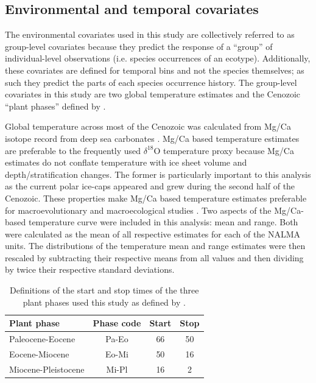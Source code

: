 \documentclass[12pt,letterpaper]{article}
\begin{document}
\subsection*{Environmental and temporal covariates}
The environmental covariates used in this study are collectively referred to as group-level covariates because they predict the response of a ``group'' of individual-level observations (i.e. species occurrences of an ecotype). Additionally, these covariates are defined for temporal bins and not the species themselves; as such they predict the parts of each species occurrence history. The group-level covariates in this study are two global temperature estimates and the Cenozoic ``plant phases'' defined by \citet{Graham2011a}. 

Global temperature across most of the Cenozoic was calculated from Mg/Ca isotope record from deep sea carbonates \citep{Cramer2011}. Mg/Ca based temperature estimates are preferable to the frequently used \(\delta^{18}\)O temperature proxy \citep{Zachos2001,Zachos2008,Alroy2000g,Figueirido2012} because Mg/Ca estimates do not conflate temperature with ice sheet volume and depth/stratification changes. The former is particularly important to this analysis as the current polar ice-caps appeared and grew during the second half of the Cenozoic. These properties make Mg/Ca based temperature estimates preferable for macroevolutionary and macroecological studies \citep{Ezard2016a}. Two aspects of the Mg/Ca-based temperature curve were included in this analysis: mean and range. Both were calculated as the mean of all respective estimates for each of the NALMA units. The distributions of the temperature mean and range estimates were then rescaled by subtracting their respective means from all values and then dividing by twice their respective standard deviations.

\begin{table}
  \centering
  \caption[Plant phase defintions]{Definitions of the start and stop times of the three plant phases used this study as defined by \citet{Graham2011a}.}
  \label{tab:plant_def}
  \begin{tabular}{l c c c}
    \hline
    Plant phase & Phase code & Start & Stop \\
    \hline
    Paleocene-Eocene & Pa-Eo & 66 & 50 \\
    Eocene-Miocene & Eo-Mi & 50 & 16 \\
    Miocene-Pleistocene & Mi-Pl & 16 & 2 \\
  \end{tabular}
\end{table}
\end{document}
